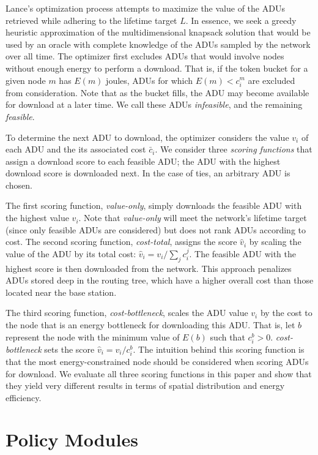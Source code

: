 \documentclass[lettersize]{sig-alternate-konrad}
\begin{document}
Lance's optimization process attempts to maximize the value of the ADUs
retrieved while adhering to the lifetime target $L$. In essence, we seek a
greedy heuristic approximation of the multidimensional knapsack solution that
would be used by an oracle with complete knowledge of the ADUs sampled by the
network over all time.  The optimizer first excludes ADUs that would involve
nodes without enough energy to perform a download.  That is, if the token
bucket for a given node $m$ has $E(m)$ joules, ADUs for which $E(m) < c_i^m$
are excluded from consideration.  Note that as the bucket fills, the ADU may
become available for download at a later time. We call these ADUs {\em
infeasible}, and the remaining {\em feasible}.

To determine the next ADU to download, the optimizer considers the 
value $v_i$ of each ADU and the its associated cost $\bar{c}_i$.
We consider three {\em scoring functions} that assign a 
download score to each feasible ADU; the ADU with the highest download score
is downloaded next. In the case of ties, an arbitrary ADU is chosen.

The first scoring function, {\em value-only}, simply downloads the feasible
ADU with the highest value $v_i$. Note that {\em value-only} will meet the
network's lifetime target (since only feasible ADUs are considered) but does
not rank ADUs according to cost.  The second scoring function, {\em
cost-total}, assigns the score $\hat{v}_i$ by scaling the value of the ADU by
its total cost: $\hat{v}_i = v_i / \sum_j c_i^j$. The feasible ADU with the
highest score is then downloaded from the network. This approach penalizes
ADUs stored deep in the routing tree, which have a higher overall cost than
those located near the base station. 

The third scoring function, {\em cost-bottleneck}, scales the ADU value $v_i$ 
by the cost to the node that is an energy bottleneck for downloading
this ADU. That is, let $b$ represent the node with the minimum value
of $E(b)$ such that $c_i^b > 0$. {\em cost-bottleneck} sets the score
$\hat{v}_i = v_i / c_i^b$. The intuition behind this scoring function is
that the most energy-constrained node should be considered when
scoring ADUs for download. We evaluate all three scoring functions in 
this paper and show that they yield very different results in terms
of spatial distribution and energy efficiency.

\section{Policy Modules}
\label{sec-policies}
\end{document}
